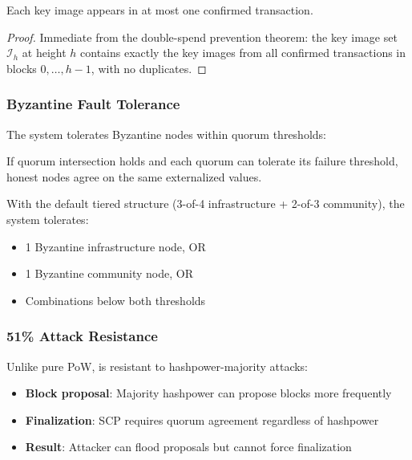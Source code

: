 \begin{corollary}
Each key image appears in at most one confirmed transaction.
\end{corollary}

\begin{proof}
Immediate from the double-spend prevention theorem: the key image set
$\mathcal{I}_h$ at height $h$ contains exactly the key images from all
confirmed transactions in blocks $0, \ldots, h-1$, with no duplicates.
\end{proof}

\subsubsection{Byzantine Fault Tolerance}

The system tolerates Byzantine nodes within quorum thresholds:

\begin{theorem}
If quorum intersection holds and each quorum can tolerate its failure
threshold, honest nodes agree on the same externalized values.
\end{theorem}

With the default tiered structure (3-of-4 infrastructure + 2-of-3 community),
the system tolerates:
\begin{itemize}
  \item 1 Byzantine infrastructure node, OR
  \item 1 Byzantine community node, OR
  \item Combinations below both thresholds
\end{itemize}

\subsubsection{51\% Attack Resistance}

Unlike pure PoW, \Botho is resistant to hashpower-majority attacks:

\begin{itemize}
  \item \textbf{Block proposal}: Majority hashpower can propose blocks
    more frequently
  \item \textbf{Finalization}: SCP requires quorum agreement regardless
    of hashpower
  \item \textbf{Result}: Attacker can flood proposals but cannot force
    finalization
\end{itemize}

